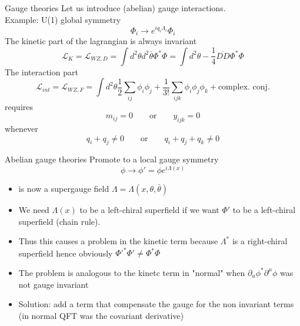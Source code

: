 \documentclass[10pt]{beamer}
\begin{document}
\begin{frame}{Gauge theories}
Let us introduce (abelian) gauge interactions. \\ 
Example: U(1) global symmetry 
\begin{equation*}
    \Phi_i \rightarrow e^{iq_i\Lambda_i}\Phi_i
\end{equation*}
The kinetic part of the lagrangian is always invariant
\begin{equation*}
    \mathcal{L}_{K} = \mathcal{L}_{WZ,D} = \int d^2\theta d^2 \bar\theta \Phi^*\Phi = \int d^2\theta -\frac{1}{4} \overline{D D} \Phi^*\Phi
\end{equation*}
The interaction part 
\begin{equation*}
    \mathcal{L}_{int} = \mathcal{L}_{WZ,F} = \int d^2\theta \frac{1}{2} \sum_{ij} \phi_i \phi_j + \frac{1}{3!} \sum_{ijk} \phi_i \phi_j \phi_k + \text{complex. conj.}
\end{equation*}
requires
\begin{equation*}
    m_{ij} = 0 \qquad \text{or} \qquad y_{ijk} = 0
\end{equation*}
whenever
\begin{equation*}
    q_i + q_j \neq 0 \qquad \text{or} \qquad q_i + q_j + q_k \neq 0
\end{equation*}
\end{frame}

\begin{frame}{Abelian gauge theories}
Promote to a local gauge symmetry
\begin{equation*}
    \phi \rightarrow \phi' = \phi e^{i\Lambda(x)}
\end{equation*}
\begin{itemize}
    \item  is now a supergauge field $\Lambda = \Lambda(x, \theta, \bar\theta)$
    \item We need $\Lambda(x)$ to be a left-chiral superfield if we want $\Phi'$ to be a left-chiral superfield (chain rule). \\ 
    \item Thus this causes a problem in the kinetic term because $\Lambda^*$ is a right-chiral superfield
    hence obviously $\Phi'^*\Phi' \neq \Phi^*\Phi$
    \item The problem is analogous to the kinetc term in "normal" when $\partial_u \phi^* \partial^\mu \phi$ was not gauge invariant
    \item Solution: add a term that compensate the gauge for the non invariant terms (in normal QFT was the covariant derivative)
\end{itemize}
\end{frame}
\end{document}
